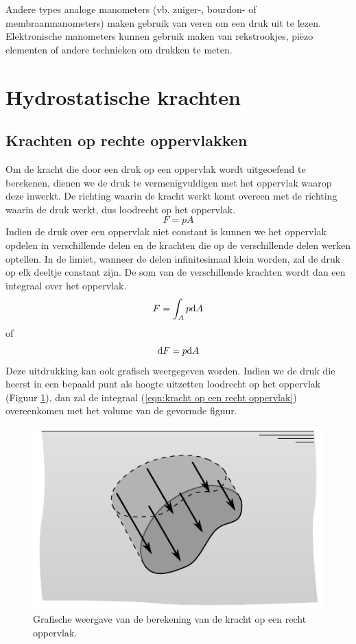Andere types analoge manometers (vb. zuiger-, bourdon- of membraanmanometers) maken gebruik van veren om een druk uit te lezen. Elektronische manometers kunnen gebruik maken van rekstrookjes, piëzo elementen of andere technieken om drukken te meten.

	\section{Hydrostatische krachten}
	\label{sec:Hydrostatische krachten}

		\subsection{Krachten op rechte oppervlakken}
Om de kracht die door een druk op een oppervlak wordt uitgeoefend te berekenen, dienen we de druk te vermenigvuldigen met het oppervlak waarop deze inwerkt. De richting waarin de kracht werkt komt overeen met de richting waarin de druk werkt, dus loodrecht op het oppervlak.
\begin{equation}
	F = p A
\end{equation}
Indien de druk over een oppervlak niet constant is kunnen we het oppervlak opdelen in verschillende delen en de krachten die op de verschillende delen werken optellen. In de limiet, wanneer de delen infinitesimaal klein worden, zal de druk op elk deeltje constant zijn. De som van de verschillende krachten wordt dan een integraal over het oppervlak.
\begin{equation}
	F = \int_A p \mathrm{d} A
	\label{eqn:kracht op een recht oppervlak}
\end{equation}
of
\begin{equation}
	\mathrm{d} F = p \mathrm{d} A
\end{equation}
Deze uitdrukking kan ook grafisch weergegeven worden. Indien we de druk die heerst in een bepaald punt als hoogte uitzetten loodrecht op het oppervlak (Figuur \ref{fig:grafische_weergave_integraal}), dan zal de integraal (\ref{eqn:kracht op een recht oppervlak}) overeenkomen met het volume van de gevormde figuur.

\begin{figure}[htb]
	\centering
	\includegraphics{fig/hydrostatica/grafische_weergave_integraal}
	\caption{Grafische weergave van de berekening van de kracht op een recht oppervlak.}
	\label{fig:grafische_weergave_integraal}
\end{figure}

